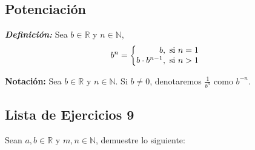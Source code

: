 \documentclass[11pt]{article}
\newcommand{\N}{\mathbb{N}}
\newcommand{\R}{\mathbb{R}}
\newcommand{\bfit}[1]{\textbf{\textit{#1}}}
\begin{document}
\subsection*{Potenciación}

\bfit{Definición:}  Sea $b\in \R$ y $n\in \N$,
 \[
  b^n = \left\{
 \begin{array}{@{}r@{\thinspace}l}
  b, &  \ \text{si}  \ n = 1\\
  b\cdot b^{n-1}, &  \ \text{si}  \ n > 1
 \end{array} \right. \]

 \textbf{Notación:} Sea $b\in \R$ y $n\in \N$. Si $b \neq 0$, denotaremos $\frac{1}{b^n}$ como $b^{-n}$.

\subsection*{Lista de Ejercicios 9}

Sean $a, b\in \R$ y $m,n\in \N$, demuestre lo siguiente:
\end{document}

